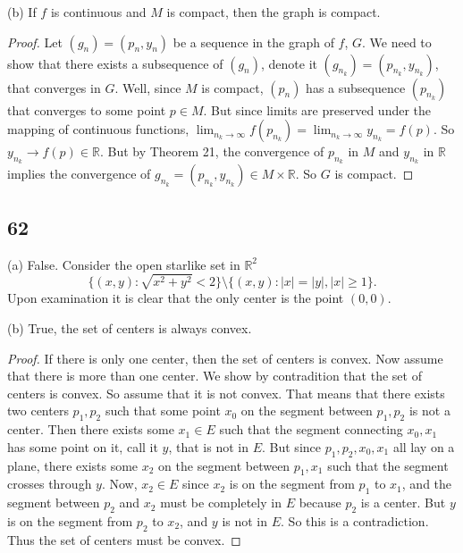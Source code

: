 \documentclass[11pt]{amsart}
\begin{document}
(b) If $f$ is continuous and $M$ is compact, then the graph is compact.

\begin{proof}
  Let $(g_{n}) = (p_{n}, y_{n})$ be a sequence in the graph of $f$, $G$. We need to show that there exists a subsequence of $(g_{n})$, denote it $(g_{n_{k}}) = (p_{n_{k}}, y_{n_{k}})$, that converges in $G$. Well, since $M$ is compact, $(p_{n})$ has a subsequence $(p_{n_{k}})$ that converges to some point $p\in M$. But since limits are preserved under the mapping of continuous functions, $\lim_{n_{k}\rightarrow \infty}f(p_{n_{k}}) = \lim_{n_{k}\rightarrow\infty}y_{n_{k}} = f(p)$. So $y_{n_{k}}\rightarrow f(p)\in \mathbb{R}$. But by Theorem 21, the convergence of $p_{n_{k}}$ in $M$ and $y_{n_{k}}$ in $\mathbb{R}$ implies the convergence of $g_{n_{k}} = (p_{n_{k}}, y_{n_{k}}) \in M\times \mathbb{R}$. So $G$ is compact.
\end{proof}

\subsection*{62} (a) False. Consider the open starlike set in $\mathbb{R}^{2}$
\[ \{(x,y): \sqrt{x^{2} + y^{2}} < 2\} \setminus \{ (x,y) : |x| = |y|, |x| \geq 1\}.\]
Upon examination it is clear that the only center is the point $(0,0)$.

(b) True, the set of centers is always convex.

\begin{proof}
  If there is only one center, then the set of centers is convex. Now assume that there is more than one center. We show by contradition that the set of centers is convex. So assume that it is not convex. That means that there exists two centers $p_{1}, p_{2}$ such that some point $x_{0}$ on the segment between $p_{1}, p_{2}$ is not a center. Then there exists some $x_{1} \in E$ such that the segment connecting $x_{0}, x_{1}$ has some point on it, call it $y$, that is not in $E$. But since $p_{1}, p_{2}, x_{0}, x_{1}$ all lay on a plane, there exists some $x_{2}$ on the segment between $p_{1}, x_{1}$ such that the segment crosses through $y$. Now, $x_{2} \in E$ since $x_{2}$ is on the segment from $p_{1}$ to $x_{1}$, and the segment between $p_{2}$ and $x_{2}$ must be completely in $E$ because $p_{2}$ is a center. But $y$ is on the segment from $p_{2}$ to $x_{2}$, and $y$ is not in $E$. So this is a contradiction. Thus the set of centers must be convex.
\end{proof}
\end{document}
